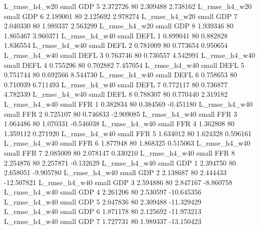  L_rmse_h4_w20      small      GDP                 5 2.372726 80       2.309488           2.738162
 L_rmse_h4_w20      small      GDP                 6 2.189001 80       2.125692           2.978274
 L_rmse_h4_w20      small      GDP                 7 2.040330 80       1.989337           2.563299
 L_rmse_h4_w20      small      GDP                 8 1.939346 80       1.865467           3.960371
 L_rmse_h4_w40      small     DEFL                 1 0.899041 80       0.882828           1.836554
 L_rmse_h4_w40      small     DEFL                 2 0.781009 80       0.773654           0.950654
 L_rmse_h4_w40      small     DEFL                 3 0.763746 80       0.730557           4.542991
 L_rmse_h4_w40      small     DEFL                 4 0.755296 80       0.702882           7.457054
 L_rmse_h4_w40      small     DEFL                 5 0.751744 80       0.692566           8.544730
 L_rmse_h4_w40      small     DEFL                 6 0.758653 80       0.710939           6.711493
 L_rmse_h4_w40      small     DEFL                 7 0.772117 80       0.736877           4.782339
 L_rmse_h4_w40      small     DEFL                 8 0.788307 80       0.770440           2.319182
 L_rmse_h4_w40      small      FFR                 1 0.382834 80       0.384569          -0.451180
 L_rmse_h4_w40      small      FFR                 2 0.725107 80       0.746833          -2.909085
 L_rmse_h4_w40      small      FFR                 3 1.064486 80       1.070331          -0.546038
 L_rmse_h4_w40      small      FFR                 4 1.362808 80       1.359112           0.271920
 L_rmse_h4_w40      small      FFR                 5 1.634012 80       1.624328           0.596161
 L_rmse_h4_w40      small      FFR                 6 1.877948 80       1.868325           0.515063
 L_rmse_h4_w40      small      FFR                 7 2.085009 80       2.078147           0.330210
 L_rmse_h4_w40      small      FFR                 8 2.254876 80       2.257871          -0.132629
 L_rmse_h4_w40      small      GDP                 1 2.394750 80       2.658051          -9.905780
 L_rmse_h4_w40      small      GDP                 2 2.138687 80       2.444433         -12.507821
 L_rmse_h4_w40      small      GDP                 3 2.594886 80       2.847167          -8.860758
 L_rmse_h4_w40      small      GDP                 4 2.261206 80       2.530597         -10.645356
 L_rmse_h4_w40      small      GDP                 5 2.047836 80       2.309488         -11.329429
 L_rmse_h4_w40      small      GDP                 6 1.871178 80       2.125692         -11.973213
 L_rmse_h4_w40      small      GDP                 7 1.727731 80       1.989337         -13.150423

